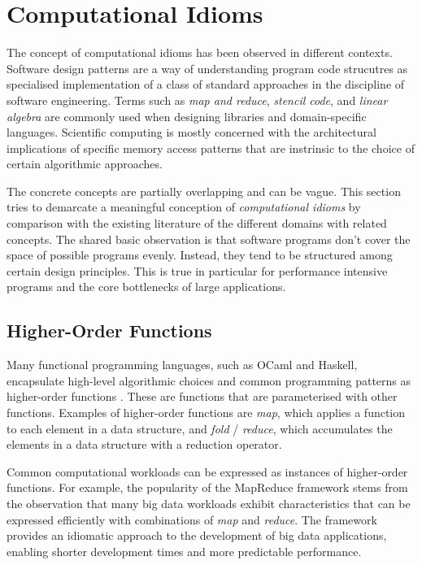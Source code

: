 \section{Computational Idioms}

    The concept of computational idioms has been observed in different contexts.
    Software design patterns are a way of understanding program code
    strucutres as specialised implementation of a class of standard approaches
    in the discipline of software engineering.
    Terms such as {\em map and reduce}, {\em stencil code}, and
    {\em linear algebra} are commonly used when designing libraries and
    domain-specific languages.
    Scientific computing is mostly concerned with the architectural
    implications of specific memory access patterns that are instrinsic to
    the choice of certain algorithmic approaches.

    The concrete concepts are partially overlapping and can be vague.
    This section tries to demarcate a meaningful conception of
    {\it computational idioms} by comparison with the existing literature of the
    different domains with related concepts.
    The shared basic observation is that software programs don't cover the space
    of possible programs evenly.
    Instead, they tend to be structured among certain design principles.
    This is true in particular for performance intensive programs and the
    core bottlenecks of large applications.

\subsection{Higher-Order Functions}

    Many functional programming languages, such as OCaml and Haskell,
    encapsulate high-level algorithmic choices and common programming patterns
    as higher-order functions \citep{Hughes:1989:WFP:63410.63411}.
    These are functions that are parameterised with other functions.
    Examples of higher-order functions are {\it map}, which applies a function
    to each element in a data structure, and {\it fold} / {\it reduce}, which
    accumulates the elements in a data structure with a reduction operator.

    Common computational workloads can be expressed as instances of
    higher-order functions.
    For example, the popularity of the MapReduce framework
    \citep{Dean2008MapReduce} stems from the observation that many big data
    workloads exhibit characteristics that can be expressed efficiently with
    combinations of {\it map} and {\it reduce}.
    The framework provides an idiomatic approach to the development of big
    data applications, enabling shorter development times and more predictable
    performance.

